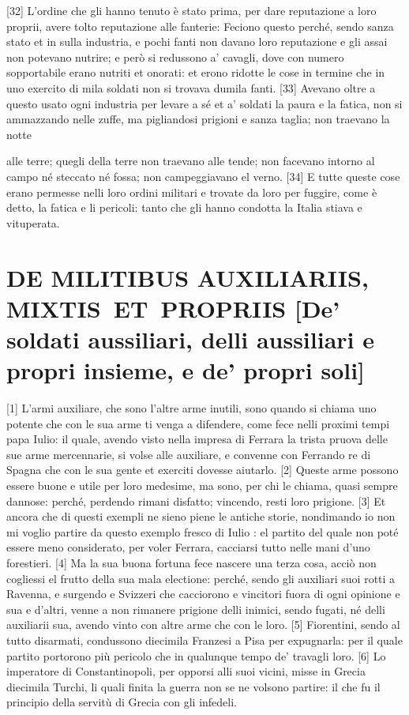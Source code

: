 {[}32{]} L'ordine che gli hanno tenuto è stato prima, per dare
reputazione a loro proprii, avere tolto reputazione alle fanterie:
Feciono questo perché, sendo sanza stato et in sulla industria, e pochi
fanti non davano loro reputazione e gli assai non potevano nutrire; e
però si redussono a' cavagli, dove con numero sopportabile erano nutriti
et onorati: et erono ridotte le cose in termine che in uno exercito di
 mila soldati non si trovava dumila fanti. {[}33{]} Avevano oltre a
questo usato ogni industria per levare a sé et a' soldati la paura e la
fatica, non si ammazzando nelle zuffe, ma pigliandosi prigioni e sanza
taglia; non traevano la notte \linebreak

\quebra

\noindent{}alle terre; quegli della terre non
traevano alle tende; non facevano intorno al campo né steccato né fossa;
non campeggiavano el verno. {[}34{]} E tutte queste cose erano permesse
nelli loro ordini militari e trovate da loro per fuggire, come è detto,
la fatica e li pericoli: tanto che gli hanno condotta la Italia stiava e
vituperata.

\quebra\section{DE MILITIBUS AUXILIARIIS, MIXTIS~ET~PROPRIIS\break
{[}De' soldati aussiliari, delli aussiliari e propri insieme, e de' propri soli{]}}

{[}1{]} L'armi auxiliare, che sono l'altre arme inutili, sono quando si
chiama uno potente che con le sua arme ti venga a difendere, come fece
nelli proximi tempi papa Iulio: il quale, avendo visto nella impresa di
Ferrara la trista pruova delle sue arme mercennarie, si volse alle
auxiliare, e convenne con Ferrando re di Spagna che con le sua gente et
exerciti dovesse aiutarlo. {[}2{]} Queste arme possono essere buone e
utile per loro medesime, ma sono, per chi le chiama, quasi sempre
dannose: perché, perdendo rimani disfatto; vincendo, resti loro
prigione. {[}3{]} Et ancora che di questi exempli ne sieno piene le
antiche storie, nondimando io non mi voglio partire da questo exemplo
fresco di Iulio : el partito del quale non poté essere meno
considerato, per voler Ferrara, cacciarsi tutto nelle mani d'uno
forestieri. {[}4{]} Ma la sua buona fortuna fece nascere una terza cosa,
acciò non cogliessi el frutto della sua mala electione: perché, sendo
gli auxiliari suoi rotti a Ravenna, e surgendo e Svizzeri che cacciorono
e vincitori fuora di ogni opinione e sua e d'altri, venne a non rimanere
prigione delli inimici, sendo fugati, né delli auxiliarii sua, avendo
vinto con altre arme che con le loro. {[}5{]} Fiorentini, sendo al tutto
disarmati, condussono diecimila Franzesi a Pisa per expugnarla: per il
quale partito portorono più pericolo che in qualunque tempo de' travagli
loro. {[}6{]} Lo imperatore di Constantinopoli, per opporsi alli suoi
vicini, misse in Grecia diecimila Turchi, li quali finita la guerra non
se ne volsono partire: il che fu il principio della servitù di Grecia
con gli infedeli.

